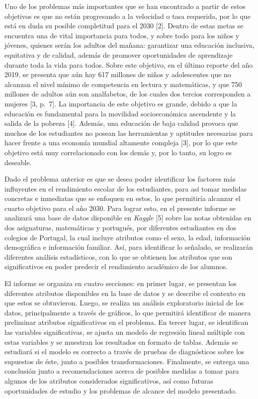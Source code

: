 \documentclass[
]{article}
\begin{document}
Uno de los problemas más importantes que se han encontrado a partir de
estos objetivos es que no están progresando a la velocidad o tasa
requerida, por lo que está en duda su posible completitud para el 2030
{[}2{]}. Dentro de estas metas se encuentra una de vital importancia
para todos, y sobre todo para los niños y jóvenes, quienes serán los
adultos del mañana: garantizar una educación inclusiva, equitativa y de
calidad, además de promover oportunidades de aprendizaje durante toda la
vida para todos. Sobre este objetivo, en el último reporte del año 2019,
se presenta que aún hay 617 millones de niños y adolescentes que no
alcanzan el nivel mínimo de competencia en lectura y matemáticas, y que
750 millones de adultos aún son analfabetos, de los cuales dos tercios
corresponden a mujeres {[}3, p.~7{]}. La importancia de este objetivo es
grande, debido a que la educación es fundamental para la movilidad
socioeconómica ascendente y la salida de la pobreza {[}4{]}. Además, una
educación de baja calidad provoca que muchos de los estudiantes no
posean las herramientas y aptitudes necesarias para hacer frente a una
economía mundial altamente compleja {[}3{]}, por lo que este objetivo
está muy correlacionado con los demás y, por lo tanto, su logro es
deseable.

Dado el problema anterior es que se desea poder identificar los factores
más influyentes en el rendimiento escolar de los estudiantes, para así
tomar medidas concretas e inmediatas que se enfoquen en estos, lo que
permitiría alcanzar el cuarto objetivo para el año 2030. Para lograr
esto, en el presente informe se analizará una base de datos disponible
en \emph{Kaggle} {[}5{]} sobre las notas obtenidas en dos asignaturas,
matemáticas y portugués, por diferentes estudiantes en dos colegios de
Portugal, la cual incluye atributos como el sexo, la edad, información
demográfica e información familiar. Así, para identificar lo señalado,
se realizarán diferentes análisis estadísticos, con lo que se obtienen
los atributos que son significativos en poder predecir el rendimiento
académico de los alumnos.

El informe se organiza en cuatro secciones: en primer lugar, se
presentan los diferentes atributos disponibles en la base de datos y se
describe el contexto en que estos se obtuvieron. Luego, se realiza un
análisis exploratorio inicial de los datos, principalmente a través de
gráficos, lo que permitirá identificar de manera preliminar atributos
significativos en el problema. En tercer lugar, se identifican las
variables significativas, se ajusta un modelo de regresión lineal
múltiple con estas variables y se muestran los resultados en formato de
tablas. Además se estudiará si el modelo es correcto a través de pruebas
de diagnósticos sobre los supuestos de éste, junto a posibles
transformaciones. Finalmente, se entrega una conclusión junto a
recomendaciones acerca de posibles medidas a tomar para algunos de los
atributos considerados significativos, así como futuras oportunidades de
estudio y los problemas de alcance del modelo presentado.
\end{document}
